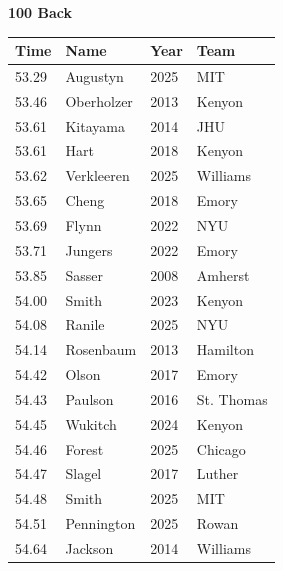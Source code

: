 \noindent\begin{minipage}[t]{0.98\textwidth}
\centering
\textbf{\textcolor{teamprimary}{100 Back}}\par
\vspace{0.5em}
\centering
\small
\renewcommand{\arraystretch}{1.0}
\setlength{\tabcolsep}{4pt}
\begin{tabular}{@{}p{2.5cm}p{4.5cm}p{1.5cm}p{2.5cm}@{}}
\toprule
\textbf{Time} & \textbf{Name} & \textbf{Year} & \textbf{Team} \\
\midrule
53.29 & Augustyn & 2025 & MIT \\
53.46 & Oberholzer & 2013 & Kenyon \\
53.61 & Kitayama & 2014 & JHU \\
53.61 & Hart & 2018 & Kenyon \\
53.62 & Verkleeren & 2025 & Williams \\
53.65 & Cheng & 2018 & Emory \\
53.69 & Flynn & 2022 & NYU \\
53.71 & Jungers & 2022 & Emory \\
53.85 & Sasser & 2008 & Amherst \\
54.00 & Smith & 2023 & Kenyon \\
54.08 & Ranile & 2025 & NYU \\
54.14 & Rosenbaum & 2013 & Hamilton \\
54.42 & Olson & 2017 & Emory \\
54.43 & Paulson & 2016 & St. Thomas \\
54.45 & Wukitch & 2024 & Kenyon \\
54.46 & Forest & 2025 & Chicago \\
54.47 & Slagel & 2017 & Luther \\
54.48 & Smith & 2025 & MIT \\
54.51 & Pennington & 2025 & Rowan \\
54.64 & Jackson & 2014 & Williams \\
\bottomrule
\end{tabular}
\end{minipage}
\vspace{1.2em}
